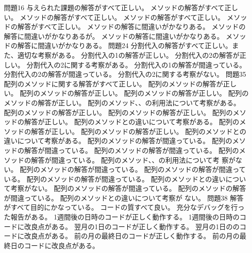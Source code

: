 {{問題1}{6}{
  {与えられた課題の解答がすべて正しい。}
	}
	{
	{メソッドの解答がすべて正しい。}
	{メソッドの解答がすべて正しい。}
	{メソッドの解答がすべて正しい。}
	{メソッドの解答がすべて正しい。}
	}
	{
	{メソッドの解答に間違いがかなりある。}
	{メソッドの解答に間違いがかなりあるが。}
	{メソッドの解答に間違いがかなりある。}
	{メソッドの解答に間違いがかなりある。}
	}
  {問題2}{4}{
	{分割代入の解答がすべて正しい。また、適切な考察がある。}
  }
  {
	{分割代入の1の解答が正しい。}
	{分割代入の2の解答が正しい。}
	{分割代入の2に関する考察がある。}
  }
  {
	{分割代入の1の解答が間違っている。}
	{分割代入の2の解答が間違っている。}
	{分割代入の2に関する考察がない。}
  }
  {問題3}{5}{
  {配列のメソッドに関する解答がすべて正しい。}
  }
  {
  {配列のメソッドの解答が正しい。}
  {配列のメソッドの解答が正しい。}
  {配列のメソッドの解答が正しい。}
  {配列のメソッドの解答が正しい。}
  {配列のメソッド、、の利用法について考察がある。}
  {配列のメソッドの解答が正しい。}
  {配列のメソッドの解答が正しい。}
  {配列のメソッドの解答が正しい。}
  {配列のメソッドとの違いについて考察がある。}
  {配列のメソッドの解答が正しい。}
  {配列のメソッドの解答が正しい。}
  {配列のメソッドとの違いについて考察がある。}
  }
  {
  {配列のメソッドの解答が間違っている。}
  {配列のメソッドの解答が間違っている。}
  {配列のメソッドの解答が間違っている。}
  {配列のメソッドの解答が間違っている。}
  {配列のメソッド、、の利用法について考
  察がない。}
  {配列のメソッドの解答が間違っている。}
  {配列のメソッドの解答が間違っている。}
  {配列のメソッドの解答が間違っている。}
  {配列のメソッドとの違いについて考察がない。}
  {配列のメソッドの解答が間違っている。}
  {配列のメソッドの解答が間違っている。}
  {配列のメソッドとの違いについて考察が
  ない。}
  }
	{問題3}{8}
	{
  {解答がすべて目的にかなっている。}
  {コードの質すべて良い。}
  {充分なデバッグを行った報告がある。}
  }
	{
  {1週間後の日時のコードが正しく動作する。}
  {1週間後の日時のコードに改良点がある。}
  {翌月の1日のコードが正しく動作する。}
  {翌月の1日ののコードに改良点がある。}
  {前の月の最終日のコードが正しく動作する。}
  {前の月の最終日のコードに改良点がある。}
}}
